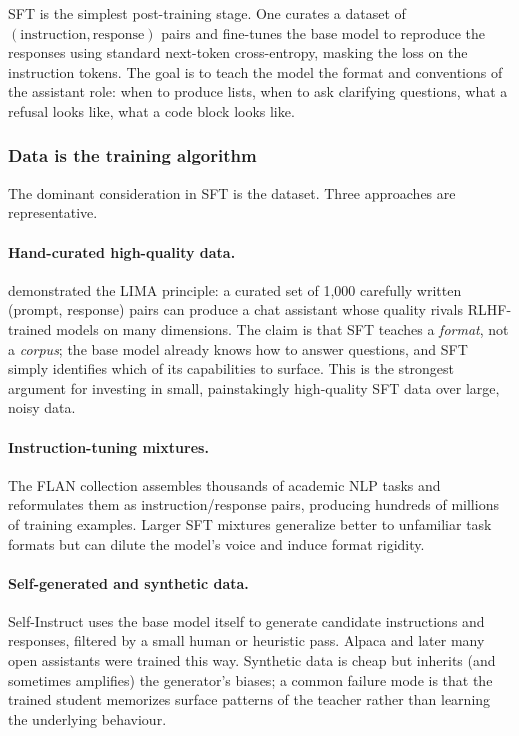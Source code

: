 SFT is the simplest post-training stage. One curates a dataset of
$(\text{instruction}, \text{response})$ pairs and fine-tunes the
base model to reproduce the responses using standard next-token
cross-entropy, masking the loss on the instruction tokens. The goal
is to teach the model the format and conventions of the assistant
role: when to produce lists, when to ask clarifying questions, what
a refusal looks like, what a code block looks like.

\subsubsection{Data is the training algorithm}

The dominant consideration in SFT is the dataset. Three approaches
are representative.

\paragraph{Hand-curated high-quality data.}
\citet{zhou2023lima} demonstrated the LIMA principle: a curated set
of 1,000 carefully written (prompt, response) pairs can produce a
chat assistant whose quality rivals RLHF-trained models on many
dimensions. The claim is that SFT teaches a \emph{format}, not a
\emph{corpus}; the base model already knows how to answer questions,
and SFT simply identifies which of its capabilities to surface. This
is the strongest argument for investing in small, painstakingly
high-quality SFT data over large, noisy data.

\paragraph{Instruction-tuning mixtures.} The FLAN collection
\citep{longpre2023flan} assembles thousands of academic NLP tasks
and reformulates them as instruction/response pairs, producing
hundreds of millions of training examples. Larger SFT mixtures
generalize better to unfamiliar task formats but can dilute the
model's voice and induce format rigidity.

\paragraph{Self-generated and synthetic data.} Self-Instruct
\citep{wang2023selfinstruct} uses the base model itself to generate
candidate instructions and responses, filtered by a small human or
heuristic pass. Alpaca and later many open assistants were trained
this way. Synthetic data is cheap but inherits (and sometimes
amplifies) the generator's biases; a common failure mode is that
the trained student memorizes surface patterns of the teacher
rather than learning the underlying behaviour.

